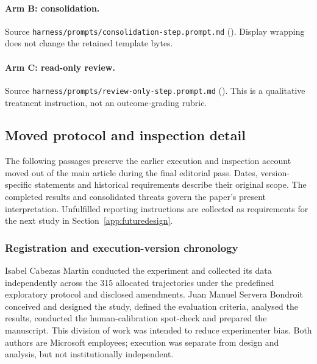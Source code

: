 \paragraph{Arm B\@: consolidation.}
Source \nolinkurl{harness/prompts/consolidation-step.prompt.md}
().
Display wrapping does not change the retained template bytes.



\noindent\begin{minipage}{\linewidth}
\paragraph{Arm C\@: read-only review.}
Source \nolinkurl{harness/prompts/review-only-step.prompt.md}
().
This is a qualitative treatment instruction, not an outcome-grading rubric.


\end{minipage}\par


\subsection{Moved protocol and inspection detail}\label{app:editorialaudit}

The following passages preserve the earlier execution and inspection account
moved out of the main article during the final editorial pass. Dates,
version-specific statements and historical requirements describe their
original scope. The completed results and consolidated threats govern the
paper's present interpretation. Unfulfilled reporting instructions are
collected as requirements for the next study in
Section~\ref{app:futuredesign}.

\subsubsection{Registration and execution-version chronology}

Isabel Cabezas Martin conducted the experiment and collected its data
independently across the 315 allocated trajectories under the predefined
exploratory protocol and disclosed amendments. Juan Manuel Servera Bondroit
conceived and designed the study, defined the evaluation criteria, analysed
the results, conducted the human-calibration spot-check and prepared the
manuscript. This division of work was intended to reduce experimenter bias.
Both authors are Microsoft employees; execution was separate from design
and analysis, but not institutionally independent.

